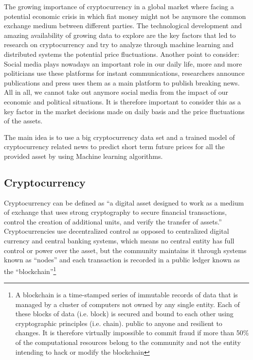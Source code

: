 The growing importance of cryptocurrency in a global market where facing a potential economic crisis in which fiat money might not be anymore the common exchange medium between different parties. The technological development and amazing availability of growing data to explore are the key factors that led to research on cryptocurrency and try to analyze through machine learning and distributed systems the potential price fluctuations. 
Another point to consider: Social media plays nowadays an important role in our daily life, more and more politicians use these platforms for instant communications, researchers announce publications and press uses them as a main platform to publish breaking news. All in all, we cannot take out anymore social media from the impact of our economic and political situations. It is therefore important to consider this as a key factor in the market decisions made on daily basis and the price fluctuations of the assets.

The main idea is to use a big cryptocurrency data set and a trained model of cryptocurrency related news to predict short term future prices for all the provided asset by using Machine learning algorithms. 

\subsection{Cryptocurrency}

Cryptocurrency can be defined as “a digital asset designed to work as a medium of exchange that uses strong cryptography to secure financial transactions, control the creation of additional units, and verify the transfer of assets.” \cite{noauthor_what_2020} Cryptocurrencies use decentralized control as opposed to centralized digital currency and central banking systems, which means no central entity has full control or power over the asset, but the community maintains it through systems known as “nodes” and each transaction is recorded in a public ledger known as the “blockchain”\footnote{A blockchain is a time-stamped series of immutable records of data that is managed by a cluster of computers not owned by any single entity. Each of these blocks of data (i.e. block) is secured and bound to each other using cryptographic principles (i.e. chain). public to anyone and resilient to changes. It is therefore virtually impossible to commit fraud if more than 50\% of the computational resources belong to the community and not the entity intending to hack or modify the blockchain\cite{ameer_rosic_what_2016}}

